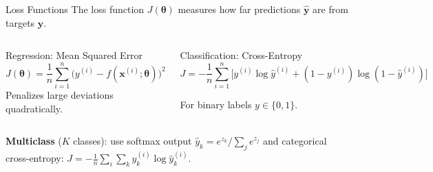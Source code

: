 \documentclass[aspectratio=169,11pt]{beamer}
\newcommand{\x}{\bm{x}}
\begin{document}
\begin{frame}{Loss Functions}
The loss function $J(\bm{\theta})$ measures how far predictions $\hat{\bm{y}}$ are from targets $\bm{y}$.

\vspace{0.4cm}
\begin{columns}[T]
\begin{block}{Regression: Mean Squared Error}
\[
    J(\bm{\theta}) = \frac{1}{n}\sum_{i=1}^{n}\big(y^{(i)} - f(\x^{(i)};\bm{\theta})\big)^{2}
\]
Penalizes large deviations quadratically.
\end{block}

\begin{block}{Classification: Cross-Entropy}
{\small
\[
    J = -\frac{1}{n}\sum_{i=1}^{n}\!\Big[y^{(i)}\!\log\hat{y}^{(i)} + (1{-}y^{(i)})\log(1{-}\hat{y}^{(i)})\Big]
\]}%
\vspace{-0.3cm}

For binary labels $y\in\{0,1\}$.
\end{block}
\end{columns}

\vspace{0.3cm}
\textbf{Multiclass} ($K$ classes): use softmax output $\hat{y}_k = e^{z_k}\big/\sum_j e^{z_j}$ and categorical cross-entropy:
$J = -\frac{1}{n}\sum_{i}\sum_{k} y_k^{(i)}\log \hat{y}_k^{(i)}$.
\end{frame}
\end{document}
